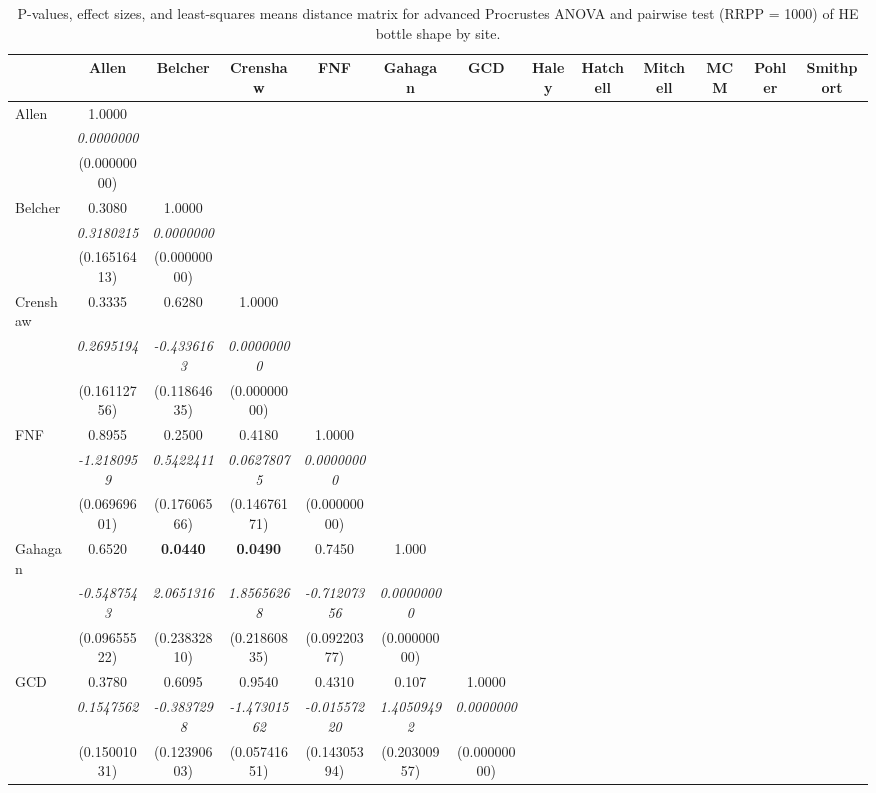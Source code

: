 \documentclass[review]{elsarticle}
\begin{document}
\begin{table}\centering
\tiny
\caption{P-values, effect sizes, and least-squares means distance matrix for advanced Procrustes ANOVA and pairwise test (RRPP = 1000) of HE bottle shape by site.}
\centering
\begin{tabular}{lcccccccccccc}
\toprule
 & Allen & Belcher & Crenshaw & FNF & Gahagan & GCD & Haley & Hatchell & Mitchell & MCM & Pohler & Smithport\\
\midrule
Allen & 1.0000 &  &  &  &  &  &  &  &  &  &  & \\
 & \textit{0.0000000} &  &  &  &  &  &  &  &  &  &  & \\
  & (0.00000000) &  &  &  &  &  &  &  &  &  &  & \\
Belcher & 0.3080 & 1.0000  &  &  &  &  &  &  &  &  &  & \\
 & \textit{0.3180215} & \textit{0.0000000} &  &  &  &  &  &  &  &  &  & \\
 & (0.16516413) & (0.00000000) &  &  &  &  &  &  &  &  &  & \\
Crenshaw & 0.3335 & 0.6280 & 1.0000 &  &  &  &  &  &  &  &  &\\
 & \textit{0.2695194} & \textit{-0.4336163} & \textit{0.00000000} &  &  &  &  &  & & &  & \\
 & (0.16112756) & (0.11864635) & (0.00000000) &  &  &  &  &  &  &  &  & \\
FNF & 0.8955 & 0.2500 & 0.4180 & 1.0000 &  &  &  &  &  &  &  & \\
 & \textit{-1.2180959} & \textit{0.5422411} & \textit{0.06278075} & \textit{0.00000000} &  &  &  &  &  &  &  & \\
 & (0.06969601) & (0.17606566) & (0.14676171) & (0.00000000) &  &  &  &  &  &  &  & \\
Gahagan & 0.6520 & \textbf{0.0440} & \textbf{0.0490} & 0.7450 & 1.000 & & & & & & &\\
 & \textit{-0.5487543} & \textit{2.0651316} & \textit{1.85656268} & \textit{-0.71207356} & \textit{0.00000000} & & & & & & &\\
 & (0.09655522) & (0.23832810) & (0.21860835) & (0.09220377) & (0.00000000) & & & & & & & \\
GCD & 0.3780 & 0.6095 & 0.9540 & 0.4310 & 0.107 & 1.0000 & & & & & & \\
 & \textit{0.1547562} & \textit{-0.3837298} & \textit{-1.47301562} & \textit{-0.01557220} & \textit{1.40509492} & \textit{0.0000000} &  &  &  &  &  & \\
 & (0.15001031) & (0.12390603) & (0.05741651) & (0.14305394) & (0.20300957) & (0.00000000) &  &  &  &  &  & \\

\end{tabular}
\end{table}
\end{document}
